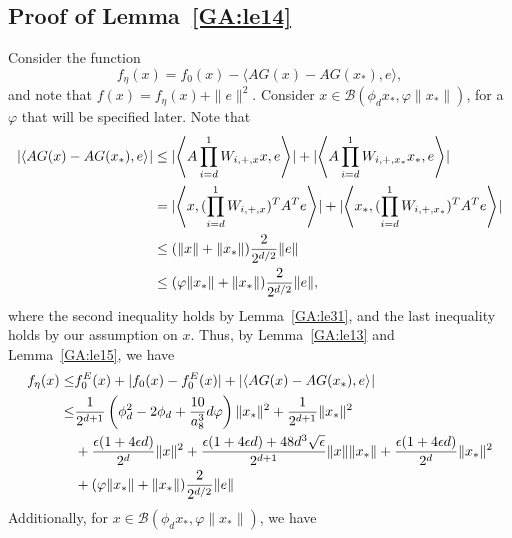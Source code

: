 \subsection{Proof of Lemma~\ref{GA:le14}}

Consider the function
\[
f_\eta(x) = f_0(x) - \langle A G(x) - A G(x_*), e \rangle,
\]
and note that $f(x) = f_\eta(x) + \|e\|^2$.
Consider $x \in \mathcal{B}(\phi_d x_*, \varphi \|x_*\|)$, for a $\varphi$ that will be specified later.
Note that
\begin{align*}
\left|\inner[]{A G(x) - A G(x_*)}{e}\right|
&\leq
|\inner[]{A \prod_{i = d}^1 W_{i, +, x} x}{e}|
+
|\inner[]{A \prod_{i = d}^1 W_{i, +, x_*} x_*}{e}| \\
&=
|\inner[]{x}{(\prod_{i = d}^1 W_{i, +, x})^T A^T e}|
+
|\inner[]{x_*}{(\prod_{i = d}^1 W_{i, +, x_*})^T A^T e}| \\
&\leq (\|x\| + \|x_*\|) \frac{2}{2^{d/2}}\|e\| \\
&\leq (\varphi \|x_*\| + \|x_*\|) \frac{2}{2^{d/2}} \|e\|,
\end{align*}
where the second inequality holds by Lemma~\ref{GA:le31}, and the last inequality holds by our assumption on $x$.
Thus, by Lemma~\ref{GA:le13} and Lemma~\ref{GA:le15}, we have
\begin{align}
f_\eta(x)
\leq&
f^E_0(x) + |f_0(x) - f^E_0(x)| +
\left|\inner[]{A G(x) - A G(x_*)}{e}\right|
\nonumber \\
%
\leq&
\frac{1}{2^{d+1}} \left( \phi_d^2 - 2 \phi_d + \frac{10}{a_8^3} d \varphi \right) \|x_*\|^2 + \frac{1}{2^{d+1}} \|x_*\|^2 \nonumber \\
&+
\frac{\epsilon (1 + 4 \epsilon d)}{2^d} \|x\|^2 + \frac{\epsilon(1 + 4 \epsilon d) + 48 d^3 \sqrt{\epsilon}}{2^{d+1}} \|x\| \|x_*\| + \frac{\epsilon (1 + 4 \epsilon d)}{2^d} \|x_*\|^2 \nonumber \\
&+ (\varphi \|x_*\| + \|x_*\|) \frac{2}{2^{d/2}} \|e\| \label{GA:e67}
%
\end{align}
Additionally, for $x \in \mathcal{B}(\phi_d x_*, \varphi  \|x_*\|)$, we have
